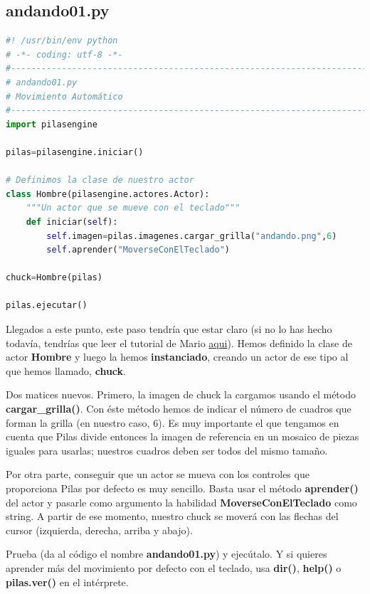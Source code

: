 \documentclass{article}
\begin{document}
\subsection{andando01.py}

\begin{lstlisting}[language=Python]
#! /usr/bin/env python
# -*- coding: utf-8 -*-
#-----------------------------------------------------------------------
# andando01.py
# Movimiento Automático
#-----------------------------------------------------------------------
import pilasengine

pilas=pilasengine.iniciar()

# Definimos la clase de nuestro actor
class Hombre(pilasengine.actores.Actor):
    """Un actor que se mueve con el teclado"""
    def iniciar(self):
        self.imagen=pilas.imagenes.cargar_grilla("andando.png",6)
        self.aprender("MoverseConElTeclado")
        
chuck=Hombre(pilas)

pilas.ejecutar()

\end{lstlisting}
Llegados a este punto, este paso tendría que estar claro (si no lo has hecho todavía,
tendrías que leer el tutorial de Mario \href{http://pilas-engine.com.ar/tutoriales/mario_renovado.pdf}{aqui}). Hemos definido la clase de actor \textbf{Hombre} y luego la hemos \textbf{instanciado}, creando un actor de ese tipo al que hemos llamado, \textbf{chuck}.\par
Dos matices nuevos. Primero, la imagen de chuck la cargamos usando el método \textbf{cargar\_grilla()}. Con éste método hemos de indicar el número de cuadros que forman la grilla (en nuestro caso, 6). Es muy importante el que tengamos en cuenta que Pilas divide entonces la imagen de referencia en un mosaico de piezas iguales para usarlas; nuestros cuadros deben ser todos del mismo tamaño.\par
Por otra parte, conseguir que un actor se mueva con los controles que proporciona Pilas por defecto es muy sencillo. Basta usar el método \textbf{aprender()} del actor y pasarle como argumento la habilidad \textbf{MoverseConElTeclado} como string. A partir de ese momento, nuestro chuck se moverá con las flechas del cursor (izquierda, derecha, arriba y abajo).\par
Prueba (da al código el nombre \textbf{andando01.py}) y ejecútalo. Y si quieres aprender más del movimiento por defecto con el teclado, usa \textbf{dir()}, \textbf{help()} o \textbf{pilas.ver()} en el intérprete.\\
\end{document}

